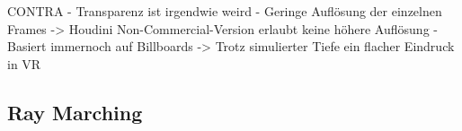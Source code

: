 CONTRA\newline
- Transparenz ist irgendwie weird\newline
- Geringe Auflösung der einzelnen Frames \newline
 -> Houdini Non-Commercial-Version erlaubt keine höhere Auflösung\newline
- Basiert immernoch auf Billboards\newline
 -> Trotz simulierter Tiefe ein flacher Eindruck in VR\newline



\subsection{Ray Marching}
\label{sec:5.2}